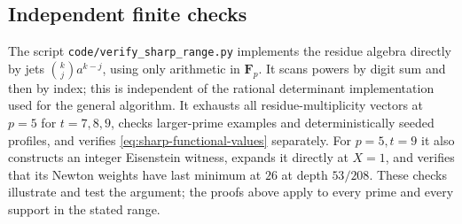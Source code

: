 \subsection{Independent finite checks}

The script \texttt{code/verify\_sharp\_range.py} implements the residue
algebra directly by jets $\binom{k}{j}a^{k-j}$, using only arithmetic
in $\mathbf F_p$.  It scans powers by digit sum and then by index;
this is independent of the rational determinant implementation used
for the general algorithm.  It exhausts all residue-multiplicity
vectors at $p=5$ for $t=7,8,9$, checks larger-prime examples and
deterministically seeded profiles, and verifies
\eqref{eq:sharp-functional-values} separately.  For $p=5,t=9$ it also
constructs an integer Eisenstein witness, expands it directly at
$X=1$, and verifies that its Newton weights have last minimum at
$26$ at depth $53/208$.  These checks illustrate and test the argument;
the proofs above apply to every prime and every support in the stated
range.

